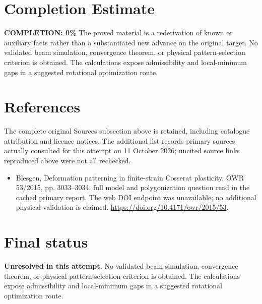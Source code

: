 \documentclass[11pt]{article}
\begin{document}
\section{Completion Estimate}
\noindent\textbf{COMPLETION: 0\%}
The proved material is a rederivation of known or auxiliary facts rather than a substantiated new advance on the original target. No validated beam simulation, convergence theorem, or physical pattern-selection criterion is obtained. The calculations expose admissibility and local-minimum gaps in a suggested rotational optimization route.
\section{References}
The complete original Sources subsection above is retained, including catalogue attribution and licence notices. The additional list records primary sources actually consulted for this attempt on 11 October 2026; uncited source links reproduced above were not all rechecked.
\begin{itemize}
\item Blesgen, Deformation patterning in finite-strain Cosserat plasticity, OWR 53/2015, pp. 3033--3034; full model and polygonization question read in the cached primary report. The web DOI endpoint was unavailable; no additional physical validation is claimed. \url{https://doi.org/10.4171/owr/2015/53}.
\end{itemize}
\section{Final status}
\textbf{Unresolved in this attempt.} No validated beam simulation, convergence theorem, or physical pattern-selection criterion is obtained. The calculations expose admissibility and local-minimum gaps in a suggested rotational optimization route.
\end{document}
